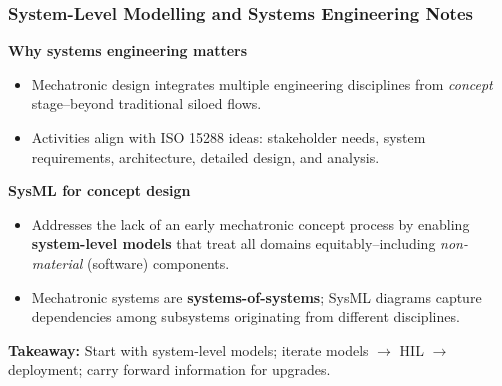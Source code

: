 \begin{frame}
	\frametitle{System-Level Modelling and Systems Engineering Notes}
  \textbf{Why systems engineering matters}
  \begin{itemize}
    \item Mechatronic design integrates multiple engineering disciplines from \emph{concept} stage--beyond traditional siloed flows.
    \item Activities align with ISO 15288 ideas: stakeholder needs, system requirements, architecture, detailed design, and analysis.
  \end{itemize}
  \textbf{SysML for concept design}
  \begin{itemize}
    \item Addresses the lack of an early mechatronic concept process by enabling \textbf{system-level models} that treat all domains equitably--including \emph{non-material} (software) components.
    \item Mechatronic systems are \textbf{systems-of-systems}; SysML diagrams capture dependencies among subsystems originating from different disciplines.
  \end{itemize}
  \textbf{Takeaway:}
  Start with system-level models; iterate models \(\rightarrow\) HIL \(\rightarrow\) deployment; carry forward information for upgrades.
\end{frame}
